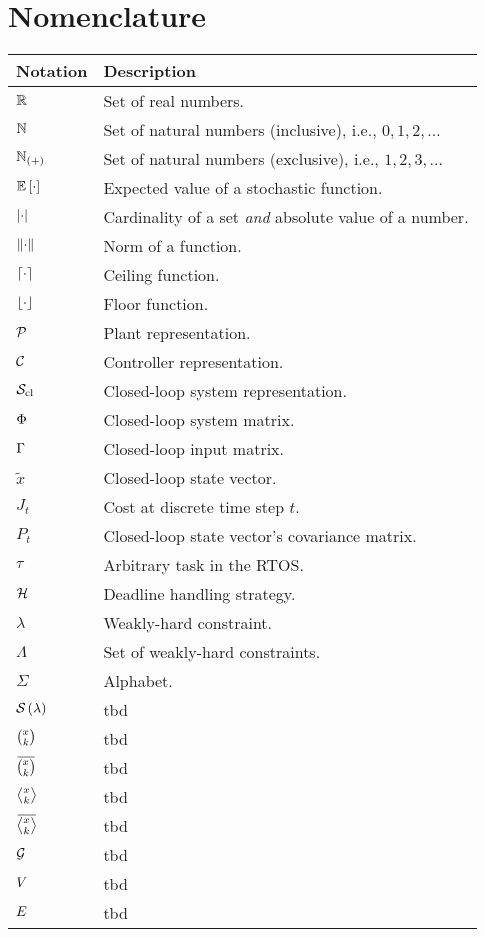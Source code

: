 \chapter*{Nomenclature}%
%
\vspace{-1.75cm}

\begin{table*}[h]
    \centering
    \begin{tabular}{l|l}%
        \textbf{Notation} & \textbf{Description} \\\hline
        $\mathbb{R}$ & Set of real numbers. \\
        $\mathbb{N}_{}$ & Set of natural numbers (inclusive), i.e., $0, 1, 2, \ldots$ \\
        $\mathbb{N}_{\left( + \right)}$ & Set of natural numbers (exclusive), i.e., $1, 2, 3, \ldots$ \\
        $\mathbb{E}\left[ \cdot \right]$ & Expected value of a stochastic function. \\
        $\left|\cdot\right|$ & Cardinality of a set \emph{and} absolute value of a number. \\
        $\lVert\cdot\rVert$ & Norm of a function. \\
        $\lceil\cdot\rceil$ & Ceiling function. \\
        $\lfloor\cdot\rfloor$ & Floor function. \\
        $\mathcal{P}$ & Plant representation. \\
        $\mathcal{C}$ & Controller representation. \\
        $\mathcal{S}_{\text{cl}}$ & Closed-loop system representation. \\
        $\Phi$ & Closed-loop system matrix. \\
        $\Gamma$ & Closed-loop input matrix. \\
        $\tilde x$ & Closed-loop state vector. \\
        $J_t$ & Cost at discrete time step $t$. \\
        $P_t$ & Closed-loop state vector's covariance matrix. \\
        $\tau$ & Arbitrary task in the RTOS. \\
        $\mathcal{H}$ & Deadline handling strategy. \\
        $\lambda$ & Weakly-hard constraint. \\
        $\Lambda$ & Set of weakly-hard constraints. \\
        $\Sigma$ & Alphabet. \\
        $\mathcal{S}_{}\left( \lambda \right)$ & tbd \\
        $\binom{x_{}}{k_{}}$ & tbd \\
        $\anymiss{}$ & tbd \\
        $\rowhit{}$ & tbd \\
        $\rowmiss{}$ & tbd \\
        $\mathcal{G}_{}$ & tbd \\
        $V_{}$ & tbd \\
        $E_{}$ & tbd \\
    \end{tabular}
\end{table*}
